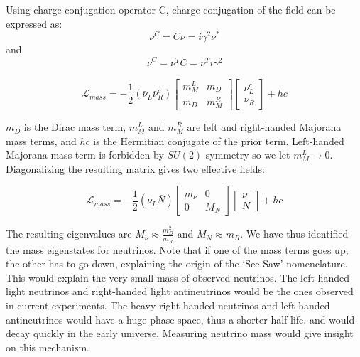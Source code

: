 Using charge conjugation operator C, charge conjugation of the field can be expressed as:
\begin{equation}\label{charge_conjugation1}
\nu^C=C\nu=i\gamma^2\nu^*
\end{equation}
and
\begin{equation}\label{charge_conjugation2}
\bar{\nu}^C=\nu^TC=\nu^Ti\gamma^2
\end{equation}

\begin{equation}\label{mass_lagrangian}
\mathcal{L}_{mass} = -\frac{1}{2}(\bar{\nu}_L\bar{\nu}_R^c) \begin{bmatrix} m_M^L & m_D \\ m_D & m_M^R \end{bmatrix} \begin{bmatrix} \nu_L^c \\ \nu_R \end{bmatrix} + hc
\end{equation}

$m_D$ is the Dirac mass term, $m_M^L$ and $m_M^R$ are left and right-handed Majorana mass terms, and $hc$ is the Hermitian conjugate of the prior term. Left-handed Majorana mass term is forbidden by $SU (2)$ symmetry so we let $m_M^L \rightarrow 0$. Diagonalizing the resulting matrix gives two effective fields: 

\begin{equation}\label{mass_lagrangian_reduced}
\mathcal{L}_{mass} = -\frac{1}{2}(\bar{\nu}_L\bar{N}) \begin{bmatrix} m_\nu & 0 \\ 0 & M_N \end{bmatrix} \begin{bmatrix} \nu \\ N \end{bmatrix} + hc
\end{equation}

The resulting eigenvalues are $M_\nu \approx \frac{m^2_D}{m_R}$ and $M_N \approx m_R$. We have thus identified the mass eigenstates for neutrinos. Note that if one of the mass terms goes up, the other has to go down, explaining the origin of the `See-Saw' nomenclature. This would explain the very small mass of observed neutrinos. The left-handed light neutrinos and right-handed light antineutrinos would be the ones observed in current experiments. The heavy right-handed neutrinos and left-handed antineutrinos would have a huge phase space, thus a shorter half-life, and would decay quickly in the early universe. Measuring neutrino mass would give insight on this mechanism. 


